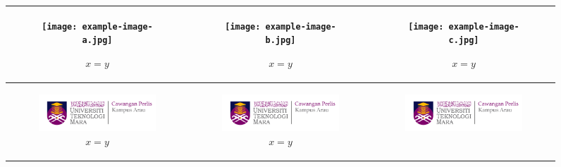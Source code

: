 \begin{landscape}

\begin{figure}[ht]
    \centering
	\begin{tabular}{|c|c|c|}
		\hline
		\begin{subfigure}[b]{0.44\textwidth}
			\centering
			\texttt{[image: example-image-a.jpg]}
			\caption{$x=y$}
         	\label{fig:ly1}
		\end{subfigure} & 
		\begin{subfigure}[b]{0.44\textwidth}
			\centering
			\texttt{[image: example-image-b.jpg]}
			\caption{$x=y$}
         	\label{fig:ly2}
		\end{subfigure} & 
		\begin{subfigure}[b]{0.44\textwidth}
			\centering
			\texttt{[image: example-image-c.jpg]}
			\caption{$x=y$}
         	\label{fig:ly3}
		\end{subfigure}\\
		\hline
		\begin{subfigure}[b]{0.44\textwidth}
			\centering
			\includegraphics[width=.8\linewidth]{mainmatter/images/logouitm.png}
			\caption{$x=y$}
         	\label{fig:ly4}
		\end{subfigure} & 
		\begin{subfigure}[b]{0.44\textwidth}
			\centering
			\includegraphics[width=.8\linewidth]{mainmatter/images/logouitm.png}
			\caption{$x=y$}
         	\label{fig:ly5}
		\end{subfigure} & 
		\begin{subfigure}[b]{0.44\textwidth}
			\centering
			\includegraphics[width=.8\linewidth]{mainmatter/images/logouitm.png}

\end{subfigure}
\end{tabular}
\end{figure}
\end{landscape}
